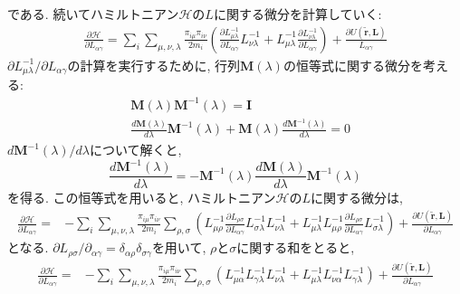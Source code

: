 である. 続いてハミルトニアン$\mathcal{H}$の$L$に関する微分を計算していく:
\begin{align}
  \frac{\partial \mathcal{H}}{\partial L_{\alpha\gamma}} =
  \sum_{i} \sum_{\mu,\nu,\lambda} \frac{\pi_{i\mu}\pi_{i\nu}}{2m_{i}}
  \left(
    \frac{\partial L_{\mu\lambda}^{-1}}{\partial L_{\alpha\gamma}} L_{\nu\lambda}^{-1} +
    L_{\mu\lambda}^{-1} \frac{\partial L_{\nu\lambda}^{-1}}{\partial L_{\alpha\gamma}}
  \right) +
  \frac{\partial U(\tilde{\bm{r}}, \bm{L})}{L_{\alpha\gamma}}
\end{align}
$\partial L_{\mu\lambda}^{-1}/\partial L_{\alpha\gamma}$の計算を実行するために, 行列$\bm{M}(\lambda)$の恒等式に関する微分を考える:
\begin{align}
  &\bm{M}(\lambda)\bm{M}^{-1}(\lambda) = \bm{I} \\
  &\frac{d\bm{M}(\lambda)}{d \lambda} \bm{M}^{-1}(\lambda) + \bm{M}(\lambda)\frac{d\bm{M}^{-1}(\lambda)}{d\lambda} = 0
\end{align}
$d\bm{M}^{-1}(\lambda)/d\lambda$について解くと, 
\begin{equation}
  \frac{d\bm{M}^{-1}(\lambda)}{d \lambda} = - \bm{M}^{-1}(\lambda)\frac{d\bm{M}(\lambda)}{d\lambda} \bm{M}^{-1}(\lambda)
\end{equation}
を得る. この恒等式を用いると, ハミルトニアン$\mathcal{H}$の$L$に関する微分は, 
\begin{align}
  \frac{\partial \mathcal{H}}{\partial L_{\alpha\gamma}} =&
  -\sum_{i} \sum_{\mu,\nu,\lambda} \frac{\pi_{i\mu}\pi_{i\nu}}{2m_{i}}
  \sum_{\rho,\sigma}
  \left(
    L_{\mu\rho}^{-1} \frac{\partial L_{\rho\sigma}}{\partial L_{\alpha\gamma}} L_{\sigma\lambda}^{-1} L_{\nu\lambda}^{-1} +
    L_{\mu\lambda}^{-1} L_{\mu\rho}^{-1} \frac{\partial L_{\rho\sigma}}{\partial L_{\alpha\gamma}} L_{\sigma\lambda}^{-1}
  \right) +
  \frac{\partial U(\tilde{\bm{r}}, \bm{L})}{\partial L_{\alpha\gamma}}
\end{align}
となる. $\partial L_{\rho\sigma}/\partial_{\alpha\gamma} = \delta_{\alpha\rho}\delta_{\sigma\gamma}$を用いて, $\rho$と$\sigma$に関する和をとると,
\begin{align}
  \frac{\partial \mathcal{H}}{\partial L_{\alpha\gamma}} =&
  -\sum_{i} \sum_{\mu,\nu,\lambda} \frac{\pi_{i\mu}\pi_{i\nu}}{2m_{i}}
  \sum_{\rho,\sigma}
  \left(
    L_{\mu\alpha}^{-1} L_{\gamma\lambda}^{-1} L_{\nu\lambda}^{-1} +
    L_{\mu\lambda}^{-1} L_{\nu\alpha}^{-1} L_{\gamma\lambda}^{-1}
  \right) +
  \frac{\partial U(\tilde{\bm{r}}, \bm{L})}{\partial L_{\alpha\gamma}}
\end{align}
